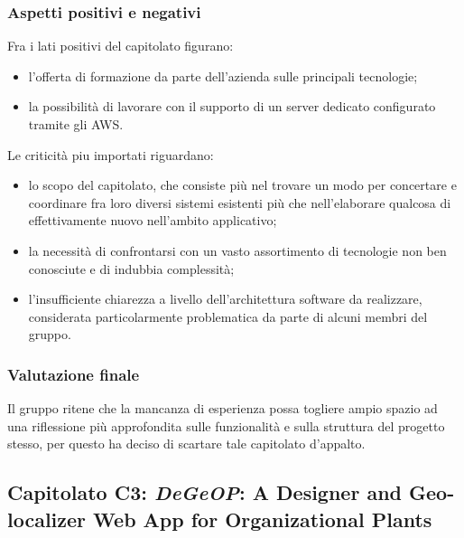 		\subsubsection{Aspetti positivi e negativi}
		Fra i lati positivi del capitolato figurano:
		\begin{itemize}
			\item l'offerta di formazione da parte dell'azienda sulle principali tecnologie;
			\item la possibilità di lavorare con il supporto di un server dedicato configurato tramite gli AWS.
		\end{itemize}
		Le criticità piu importati riguardano:
		\begin{itemize}
			\item lo scopo del capitolato, che consiste più nel trovare un modo per concertare e coordinare fra loro diversi sistemi 
			esistenti più che nell'elaborare qualcosa di effettivamente nuovo nell'ambito applicativo;
			\item la necessità di confrontarsi con un vasto assortimento di tecnologie non ben conosciute e di indubbia complessità;
			\item l'insufficiente chiarezza a livello dell'architettura software da realizzare, considerata particolarmente problematica da 
			parte di alcuni membri del gruppo.
		\end{itemize}
		\subsubsection{Valutazione finale}
		Il gruppo ritene che la mancanza di esperienza possa togliere ampio spazio ad una riflessione più approfondita sulle funzionalità e sulla 
		struttura del progetto stesso, per questo ha deciso di scartare tale capitolato d'appalto.
		
	\subsection{Capitolato C3: \emph{DeGeOP}: A Designer and Geo-localizer Web App for Organizational Plants}
